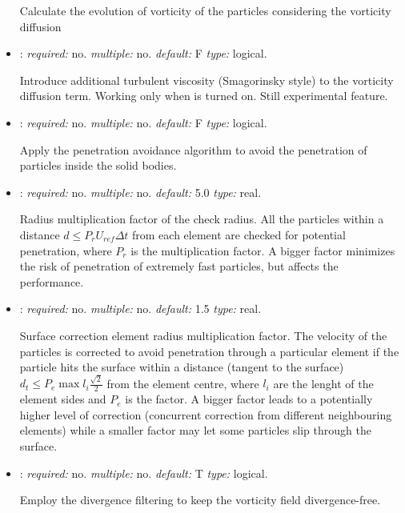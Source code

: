 \begin{itemize}
Calculate the evolution of vorticity of the particles considering the vorticity diffusion

\item {}: \textit{required:} no. \textit{multiple:} no. \textit{default:} F \textit{type:} logical.

Introduce additional turbulent viscosity (Smagorinsky style) to the vorticity diffusion term. Working only when  is turned on. Still experimental feature. 

\item {}: \textit{required:} no. \textit{multiple:} no. \textit{default:} F \textit{type:} logical.

Apply the penetration avoidance algorithm to avoid the penetration of particles inside the solid bodies.

\item {}: \textit{required:} no. \textit{multiple:} no. \textit{default:} 5.0 \textit{type:} real.

Radius multiplication factor of the check radius. All the particles within a distance $d\leq P_r U_{ref} \Delta t$ from each element are checked for potential penetration, where $P_r$ is the multiplication factor. A bigger factor minimizes the risk of penetration of extremely fast particles, but affects the performance. 

\item {}: \textit{required:} no. \textit{multiple:} no. \textit{default:} 1.5 \textit{type:} real.

Surface correction element radius multiplication factor.
The velocity of the particles is corrected to avoid penetration through a particular element if the particle hits the surface within a distance (tangent to the surface) $d_t \leq P_e \max{l_i} \frac{\sqrt{2}}{2}$ from the element centre, where $l_i$ are the lenght of the element sides and $P_e$ is the factor. 
A bigger factor leads to a potentially higher level of correction (concurrent correction from different neighbouring elements) while a smaller factor may let some particles slip through the surface. 

\item {}: \textit{required:} no. \textit{multiple:} no. \textit{default:} T \textit{type:} logical.

Employ the divergence filtering to keep the vorticity field divergence-free. 


\end{itemize}
